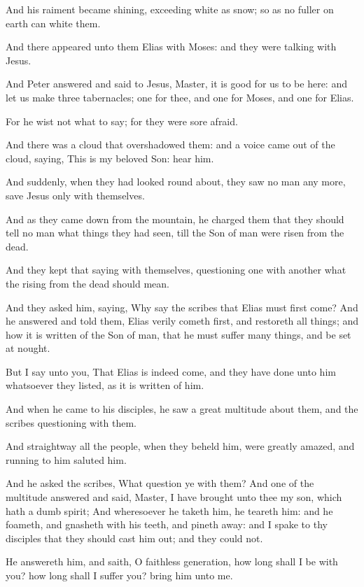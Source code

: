 \verse And his raiment became shining, exceeding white as snow; so as no fuller on earth can white them.

\verse And there appeared unto them Elias with Moses: and they were talking with Jesus.

\verse And Peter answered and said to Jesus, Master, it is good for us to be here: and let us make three tabernacles; one for thee, and one for Moses, and one for Elias.

\verse For he wist not what to say; for they were sore afraid.

\verse And there was a cloud that overshadowed them: and a voice came out of the cloud, saying, This is my beloved Son: hear him.

\verse And suddenly, when they had looked round about, they saw no man any more, save Jesus only with themselves.

\verse And as they came down from the mountain, he charged them that they should tell no man what things they had seen, till the Son of man were risen from the dead.

\verse And they kept that saying with themselves, questioning one with another what the rising from the dead should mean.

\verse And they asked him, saying, Why say the scribes that Elias must first come?  \verse And he answered and told them, Elias verily cometh first, and restoreth all things; and how it is written of the Son of man, that he must suffer many things, and be set at nought.

\verse But I say unto you, That Elias is indeed come, and they have done unto him whatsoever they listed, as it is written of him.

\verse And when he came to his disciples, he saw a great multitude about them, and the scribes questioning with them.

\verse And straightway all the people, when they beheld him, were greatly amazed, and running to him saluted him.

\verse And he asked the scribes, What question ye with them?  \verse And one of the multitude answered and said, Master, I have brought unto thee my son, which hath a dumb spirit; \verse And wheresoever he taketh him, he teareth him: and he foameth, and gnasheth with his teeth, and pineth away: and I spake to thy disciples that they should cast him out; and they could not.

\verse He answereth him, and saith, O faithless generation, how long shall I be with you? how long shall I suffer you? bring him unto me.

